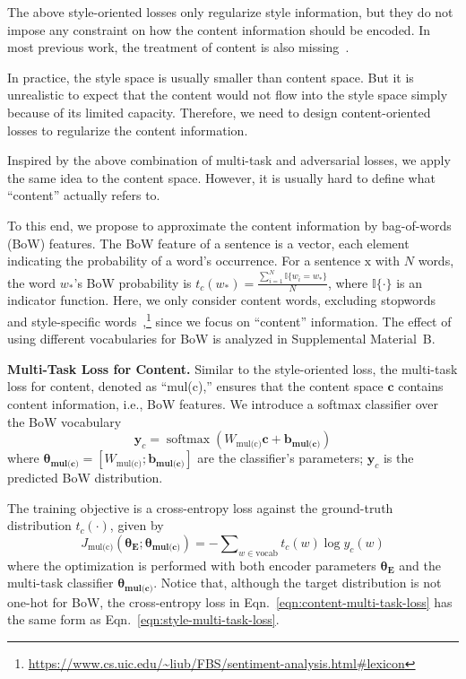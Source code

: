 \documentclass[11pt,a4paper]{article}
\newcommand{\rmx}{\mathrm x}
\newcommand{\loss}[1]{J_{\text{#1}}}
\newcommand{\nnweight}[1]{\bm{\theta_{\text{#1}}}}
\newcommand{\weight}[1]{W_{\text{#1}}}
\newcommand{\bias}[1]{\bm{b_{\text{#1}}}}
\begin{document}
The above style-oriented losses only regularize style information, but they do not impose any constraint on how the content information should be encoded. In most previous work, the treatment of content is also missing~\cite{hu2017toward,shen2017style,fu2018style}.

In practice, the style space is usually smaller than content space. But it is unrealistic to expect that the content would not flow into the style space simply because of its limited capacity. Therefore, we need to design content-oriented losses to regularize the content information.

Inspired by the above combination of multi-task and adversarial losses, we apply the same idea to the content space. However, it is usually hard to define what ``content'' actually refers to.

To this end, we propose to approximate the content information by bag-of-words (BoW) features.
The BoW feature of a sentence is a vector, each element indicating the probability of a word's occurrence.
For a sentence $\rmx$ with $N$ words, the word $w_*$'s BoW probability is 
$t_c(w_*)=\frac{\sum_{i=1}^{N}{\mathbb{I}\{w_i = w_*\}}}{N}$,
where $\mathbb{I\{\cdot\}}$ is an indicator function.
Here, we only consider content words, excluding stopwords and style-specific words~\cite{hu2004mining},\footnote{\url{https://www.cs.uic.edu/~liub/FBS/sentiment-analysis.html\#lexicon}} since we focus on ``content'' information. 
The effect of using different vocabularies for BoW is analyzed in Supplemental Material~B.

\textbf{Multi-Task Loss for Content.} Similar to the style-oriented loss, the multi-task loss for content, denoted as ``mul(c),'' ensures that the content space $\bm c$ contains content information, i.e., BoW features.
We introduce a softmax classifier over the BoW vocabulary
\begin{equation} \label{eqn:bow-pred}
	\bm y_c = \operatorname{softmax}({\weight{mul(c)}} \bm c + \bias{mul(c)})
\end{equation}
where $\nnweight{mul(c)}\!\!=\!\![\weight{mul(c)}; \bias{mul(c)}]$ are the classifier's parameters; $\bm y_c$ is the predicted BoW distribution.

The training objective is a cross-entropy loss against the ground-truth distribution $t_c(\cdot)$, given by
\begin{equation}\label{eqn:content-multi-task-loss}
	\loss{mul(c)}(\nnweight{E};\nnweight{mul(c)}) = -\!\! \sum\nolimits_{w\in\text{vocab}}\!\! t_c(w)\log y_c(w)
\end{equation}
where the optimization is performed with both encoder parameters $\nnweight{E}$ and the multi-task classifier $\nnweight{mul(c)}$.
Notice that, although the target distribution is not one-hot  for BoW, the cross-entropy loss in Eqn.~\ref{eqn:content-multi-task-loss} has the same form as Eqn.~\ref{eqn:style-multi-task-loss}.
\end{document}
